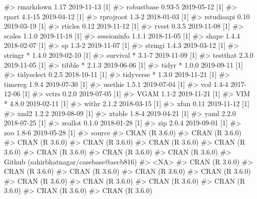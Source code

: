 \documentclass[
]{jss}
\begin{document}
\begin{CodeChunk}
\begin{CodeOutput}
#>    rmarkdown       1.17       2019-11-13 [1]
#>    robustbase      0.93-5     2019-05-12 [1]
#>    rpart           4.1-15     2019-04-12 [1]
#>    rprojroot       1.3-2      2018-01-03 [1]
#>    rstudioapi      0.10       2019-03-19 [1]
#>    rticles         0.12       2019-11-12 [1]
#>    rvest           0.3.5      2019-11-08 [1]
#>    scales          1.1.0      2019-11-18 [1]
#>    sessioninfo     1.1.1      2018-11-05 [1]
#>    shape           1.4.4      2018-02-07 [1]
#>    sp              1.3-2      2019-11-07 [1]
#>    stringi         1.4.3      2019-03-12 [1]
#>    stringr       * 1.4.0      2019-02-10 [1]
#>    survival      * 3.1-7      2019-11-09 [1]
#>    testthat        2.3.0      2019-11-05 [1]
#>    tibble        * 2.1.3      2019-06-06 [1]
#>    tidyr         * 1.0.0      2019-09-11 [1]
#>    tidyselect      0.2.5      2018-10-11 [1]
#>    tidyverse     * 1.3.0      2019-11-21 [1]
#>    timereg         1.9.4      2019-07-30 [1]
#>    usethis         1.5.1      2019-07-04 [1]
#>    vcd             1.4-4      2017-12-06 [1]
#>    vctrs           0.2.0      2019-07-05 [1]
#>    VGAM            1.1-2      2019-11-21 [1]
#>    VIM           * 4.8.0      2019-02-11 [1]
#>    withr           2.1.2      2018-03-15 [1]
#>    xfun            0.11       2019-11-12 [1]
#>    xml2            1.2.2      2019-08-09 [1]
#>    xtable          1.8-4      2019-04-21 [1]
#>    yaml            2.2.0      2018-07-25 [1]
#>    zeallot         0.1.0      2018-01-28 [1]
#>    zip             2.0.4      2019-09-01 [1]
#>    zoo             1.8-6      2019-05-28 [1]
#>  source                                  
#>  CRAN (R 3.6.0)                          
#>  CRAN (R 3.6.0)                          
#>  CRAN (R 3.6.0)                          
#>  CRAN (R 3.6.0)                          
#>  CRAN (R 3.6.0)                          
#>  CRAN (R 3.6.0)                          
#>  CRAN (R 3.6.0)                          
#>  CRAN (R 3.6.0)                          
#>  CRAN (R 3.6.0)                          
#>  Github (sahirbhatnagar/casebase@aecb816)
#>  <NA>                                    
#>  CRAN (R 3.6.0)                          
#>  CRAN (R 3.6.0)                          
#>  CRAN (R 3.6.0)                          
#>  CRAN (R 3.6.0)                          
#>  CRAN (R 3.6.0)                          
#>  CRAN (R 3.6.0)                          
#>  CRAN (R 3.6.0)                          
#>  CRAN (R 3.6.0)                          
#>  CRAN (R 3.6.0)                          
#>  CRAN (R 3.6.0)                          
#>  CRAN (R 3.6.0)                          

\end{CodeOutput}
\end{CodeChunk}
\end{document}
